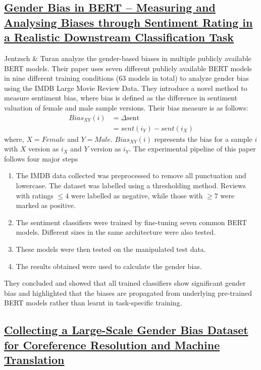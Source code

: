 \documentclass[10pt,twocolumn,letterpaper]{article}
\begin{document}
\subsection{\href{https://arxiv.org/abs/2306.15298}{Gender Bias in BERT -- Measuring and Analysing Biases through Sentiment Rating in a Realistic Downstream Classification Task}}
Jentzsch \& Turan \cite{bias-measure} analyze the gender-based biases in multiple publicly available BERT models.
Their paper uses seven different publicly available BERT models in nine different training conditions (63 models in total) to analyze gender bias using the IMDB Large Movie Review Data.
They introduce a novel method to measure sentiment bias, where bias is defined as the difference in sentiment valuation of female and male sample versions.
Their bias measure is as follows:
\begin{align*}
    Bias_{XY}(i) &= \Delta \text{sent} \\
        &= sent(i_{Y}) - sent(i_{X})
\end{align*}
where, $X=Female$ and $Y=Male$. $Bias_{XY}(i)$ represents the bias for a sample $i$ with $X$ version as $i_{X}$ and $Y$ version as $i_{Y}$.
The experimental pipeline of this paper follows four major steps
\begin{enumerate}
    \item The IMDB data collected was preprocessed to remove all punctuation and lowercase.
    The dataset was labelled using a thresholding method.
    Reviews with ratings $\leq 4$ were labelled as negative, while those with $\geq 7$ were marked as positive.
    \item The sentiment classifiers were trained by fine-tuning seven common BERT models. Different sizes in the same architecture were also tested.
    \item These models were then tested on the manipulated test data.
    \item The results obtained were used to calculate the gender bias.
\end{enumerate}
They concluded and showed that all trained classifiers show significant gender bias and highlighted that the biases are propagated from underlying pre-trained BERT models rather than learnt in task-specific training.

\subsection{\href{https://aclanthology.org/2021.findings-emnlp.211/}{Collecting a Large-Scale Gender Bias Dataset for Coreference Resolution and Machine Translation}}
\label{subsec:dataset}
\end{document}
